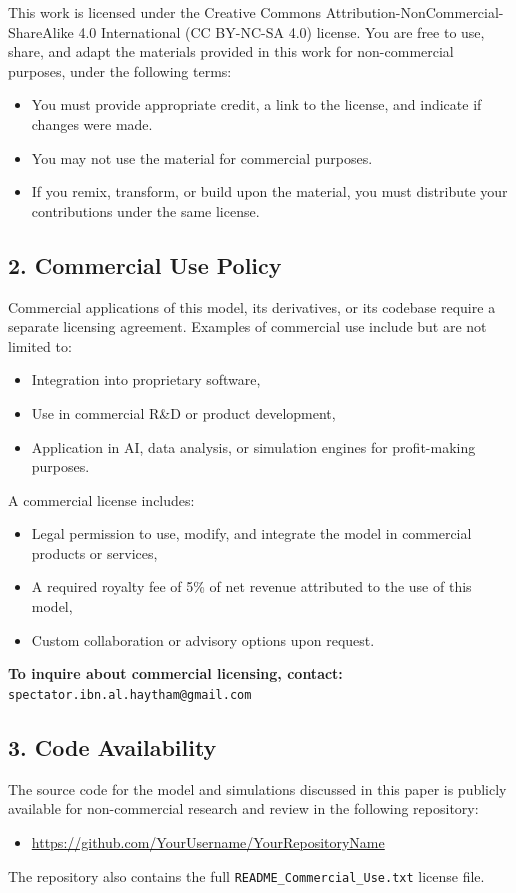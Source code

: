 \documentclass[12pt]{article}
\begin{document}
This work is licensed under the Creative Commons Attribution-NonCommercial-ShareAlike 4.0 International (CC BY-NC-SA 4.0) license.  
You are free to use, share, and adapt the materials provided in this work for non-commercial purposes, under the following terms:
\begin{itemize}
    \item You must provide appropriate credit, a link to the license, and indicate if changes were made.
    \item You may not use the material for commercial purposes.
    \item If you remix, transform, or build upon the material, you must distribute your contributions under the same license.
\end{itemize}

\subsection*{2. Commercial Use Policy}

Commercial applications of this model, its derivatives, or its codebase require a separate licensing agreement.  
Examples of commercial use include but are not limited to:
\begin{itemize}
    \item Integration into proprietary software,
    \item Use in commercial R\&D or product development,
    \item Application in AI, data analysis, or simulation engines for profit-making purposes.
\end{itemize}

A commercial license includes:
\begin{itemize}
    \item Legal permission to use, modify, and integrate the model in commercial products or services,
    \item A required royalty fee of 5\% of net revenue attributed to the use of this model,
    \item Custom collaboration or advisory options upon request.
\end{itemize}

\noindent\textbf{To inquire about commercial licensing, contact:}  
\texttt{spectator.ibn.al.haytham@gmail.com}

\subsection*{3. Code Availability}

The source code for the model and simulations discussed in this paper is publicly available for non-commercial research and review in the following repository:
\begin{itemize}
    \item \url{https://github.com/YourUsername/YourRepositoryName} %
\end{itemize}
The repository also contains the full \texttt{README\_Commercial\_Use.txt} license file.
\end{document}
